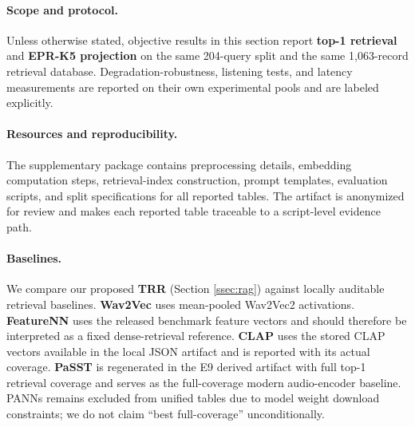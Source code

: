 \paragraph{Scope and protocol.}
Unless otherwise stated, objective results in this section report \textbf{top-1 retrieval} and \textbf{EPR-K5 projection} on the same 204-query split and the same 1,063-record retrieval database. Degradation-robustness, listening tests, and latency measurements are reported on their own experimental pools and are labeled explicitly.

\paragraph{Resources and reproducibility.}
\label{sec:repro}
The supplementary package contains preprocessing details, embedding computation steps, retrieval-index construction, prompt templates, evaluation scripts, and split specifications for all reported tables. The artifact is anonymized for review and makes each reported table traceable to a script-level evidence path.

\paragraph{Baselines.}
We compare our proposed \textbf{TRR} (Section \ref{ssec:rag}) against locally auditable retrieval baselines. \textbf{Wav2Vec} uses mean-pooled Wav2Vec2 activations. \textbf{FeatureNN} uses the released benchmark feature vectors and should therefore be interpreted as a fixed dense-retrieval reference. \textbf{CLAP} uses the stored CLAP vectors available in the local JSON artifact and is reported with its actual coverage. \textbf{PaSST} is regenerated in the E9 derived artifact with full top-1 retrieval coverage and serves as the full-coverage modern audio-encoder baseline. PANNs remains excluded from unified tables due to model weight download constraints; we do not claim ``best full-coverage'' unconditionally.

